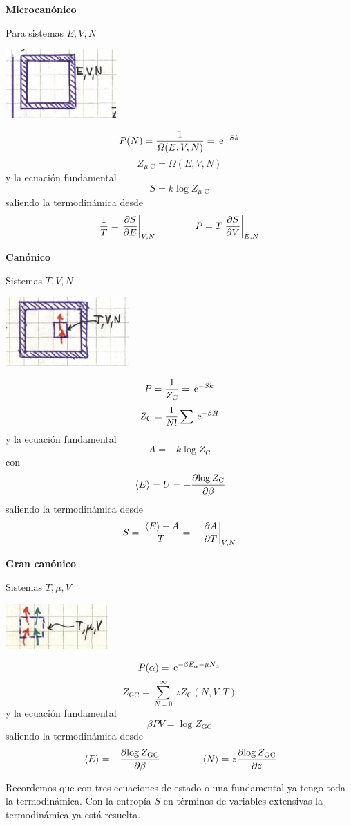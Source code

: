 \documentclass[10pt,oneside]{CBFT_book}
\begin{document}
{\bf Microcanónico}

Para sistemas $E,V,N$

\includegraphics[scale=0.5]{images/1606329440.jpg}

\[
	P(N) = \frac{ 1 }{ \Omega(E,V,N) } = \:\mathrm{e}^{-Sk}
\]
\[
	Z_\text{$\mu$ C} = \Omega(E,V,N) 
\]
y la ecuación fundamental
\[
	S = k \log Z_\text{$\mu$ C}
\]
saliendo la termodinámica desde
\[
	\frac{1}{T} = \left.\frac{\partial^{\hspace{-0.05em}} {S}}{\partial {E}^{\hspace{-0.05em}}}\right|_{V,N} \qquad \qquad P = T \left.\frac{\partial^{\hspace{-0.05em}} {S}}{\partial {V}^{\hspace{-0.05em}}}\right|_{E,N}
\]

{\bf Canónico}

Sistemas $T,V,N$

\includegraphics[scale=0.5]{images/1606329443.jpg}

\[
	P = \frac{ 1 }{ Z_\text{C} } = \:\mathrm{e}^{-Sk}
\]
\[
	Z_\text{C} = \frac{1}{N!} \sum \:\mathrm{e}^{-\beta H}
\]
y la ecuación fundamental
\[
	A = - k \log Z_\text{C}
\]
con 
\[
	\:\left\langle E \right\rangle = U = - \frac{\partial^{\hspace{-0.05em}} {\log Z_\text{C}}}{\partial { \beta }^{\hspace{-0.05em}}}
\]
saliendo la termodinámica desde
\[
	S = \frac{ \:\left\langle E \right\rangle - A }{T} = -\left.\frac{\partial^{\hspace{-0.05em}} {A}}{\partial {T}^{\hspace{-0.05em}}}\right|_{V,N} 
\]

{\bf Gran canónico}

Sistemas $T,\mu,V$

\includegraphics[scale=0.5]{images/1606329447.jpg}

\[
	P(\alpha) = \:\mathrm{e}^{-\beta E_\alpha - \mu N_\alpha }
\]
\[
	Z_\text{GC} = \sum_{N=0}^\infty \: z Z_\text{C}(N,V,T)
\]
y la ecuación fundamental
\[
	\beta P V = \log Z_\text{GC}
\]
saliendo la termodinámica desde
\[
	\:\left\langle E \right\rangle = -\frac{\partial^{\hspace{-0.05em}} {\log Z_\text{GC}}}{\partial {\beta}^{\hspace{-0.05em}}} \qquad \qquad  \:\left\langle N \right\rangle = z \frac{\partial^{\hspace{-0.05em}} {\log Z_\text{GC}}}{\partial {z}^{\hspace{-0.05em}}}
\]

Recordemos que con tres ecuaciones de estado o una fundamental ya tengo toda la termodinámica.
Con la entropía $S$ en términos de variables extensivas la termodinámica ya está resuelta.
\end{document}
